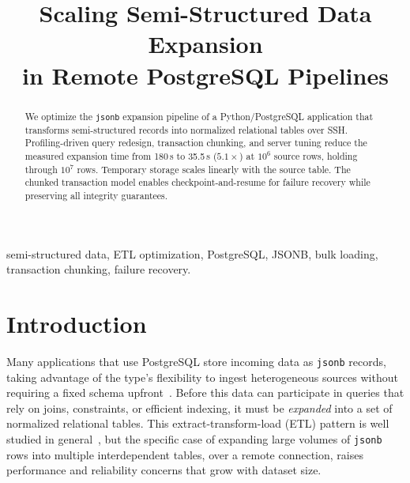 \documentclass[journal]{IEEEtran}
\begin{document}
\title{Scaling Semi-Structured Data Expansion\\in Remote PostgreSQL Pipelines}

\author{
}

\maketitle

\begin{abstract}
We optimize the \texttt{jsonb} expansion pipeline of a Python/PostgreSQL application that transforms semi-structured records into normalized relational tables over SSH.
Profiling-driven query redesign, transaction chunking, and server tuning reduce the measured expansion time from 180\,s to 35.5\,s ($5.1\times$) at $10^6$ source rows, holding through $10^7$ rows.
Temporary storage scales linearly with the source table.
The chunked transaction model enables checkpoint-and-resume for failure recovery while preserving all integrity guarantees.
\end{abstract}

\begin{IEEEkeywords}
semi-structured data, ETL optimization, PostgreSQL, JSONB, bulk loading, transaction chunking, failure recovery.
\end{IEEEkeywords}

\section{Introduction}
\label{sec:intro}

Many applications that use PostgreSQL store incoming data as \texttt{jsonb} records, taking advantage of the type's flexibility to ingest heterogeneous sources without requiring a fixed schema upfront~\cite{postgresql17, petersen2011json}.
Before this data can participate in queries that rely on joins, constraints, or efficient indexing, it must be \emph{expanded} into a set of normalized relational tables.
This extract-transform-load (ETL) pattern is well studied in general~\cite{vassiliadis2009etl}, but the specific case of expanding large volumes of \texttt{jsonb} rows into multiple interdependent tables, over a remote connection, raises performance and reliability concerns that grow with dataset size.
\end{document}
